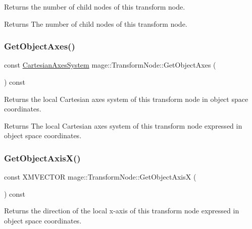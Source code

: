 Returns the number of child nodes of this transform node.

\begin{DoxyReturn}{Returns}
The number of child nodes of this transform node. 
\end{DoxyReturn}
\hypertarget{structmage_1_1_transform_node_a3e6b79b7e1a0844d8f93acaecdf65346}{}\label{structmage_1_1_transform_node_a3e6b79b7e1a0844d8f93acaecdf65346} 
\subsubsection{\texorpdfstring{Get\+Object\+Axes()}{GetObjectAxes()}}
{\footnotesize\ttfamily const \hyperlink{structmage_1_1_cartesian_axes_system}{Cartesian\+Axes\+System} mage\+::\+Transform\+Node\+::\+Get\+Object\+Axes (\begin{DoxyParamCaption}{ }\end{DoxyParamCaption}) const\hspace{0.3cm}{\ttfamily [noexcept]}}

Returns the local Cartesian axes system of this transform node in object space coordinates.

\begin{DoxyReturn}{Returns}
The local Cartesian axes system of this transform node expressed in object space coordinates. 
\end{DoxyReturn}
\hypertarget{structmage_1_1_transform_node_a0e31d129c0a6524a612ce28db24f0600}{}\label{structmage_1_1_transform_node_a0e31d129c0a6524a612ce28db24f0600} 
\subsubsection{\texorpdfstring{Get\+Object\+Axis\+X()}{GetObjectAxisX()}}
{\footnotesize\ttfamily const X\+M\+V\+E\+C\+T\+OR mage\+::\+Transform\+Node\+::\+Get\+Object\+AxisX (\begin{DoxyParamCaption}{ }\end{DoxyParamCaption}) const\hspace{0.3cm}{\ttfamily [noexcept]}}

Returns the direction of the local x-\/axis of this transform node expressed in object space coordinates.

